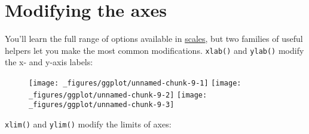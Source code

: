 \hypertarget{sec:axes}{%
\section{Modifying the axes}\label{sec:axes}}

You'll learn the full range of options available in
\protect\hyperlink{cha:scales}{scales}, but two families of useful
helpers let you make the most common modifications. \texttt{xlab()} and
\texttt{ylab()} modify the x- and y-axis labels: 

\begin{Shaded}
\begin{Highlighting}[]
\OperatorTok{+}
\StringTok{  }\NormalTok{(}  \OperatorTok{/}\StringTok{ }\NormalTok{)}

\OperatorTok{+}
\StringTok{  }\NormalTok{(}  \OperatorTok{/}\StringTok{ }\NormalTok{) }\OperatorTok{+}\StringTok{ }
\StringTok{  }\NormalTok{(}\NormalTok{) }\OperatorTok{+}\StringTok{ }
\StringTok{  }\NormalTok{(}\NormalTok{)}

\OperatorTok{+}
\StringTok{  }\NormalTok{(}  \OperatorTok{/}\StringTok{ }\NormalTok{) }\OperatorTok{+}\StringTok{ }
\StringTok{  }\NormalTok{(}\NormalTok{) }\OperatorTok{+}\StringTok{ }
\StringTok{  }\NormalTok{(}\NormalTok{)}
\end{Highlighting}
\end{Shaded}

\begin{figure}[H]
  \texttt{[image: \_figures/ggplot/unnamed-chunk-9-1]}%
  \texttt{[image: \_figures/ggplot/unnamed-chunk-9-2]}%
  \texttt{[image: \_figures/ggplot/unnamed-chunk-9-3]}
\end{figure}

\texttt{xlim()} and \texttt{ylim()} modify the limits of axes:
 

